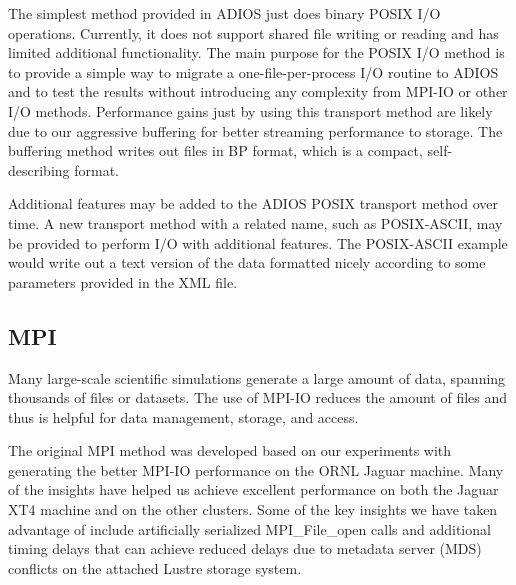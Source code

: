 The simplest method provided in ADIOS just does binary POSIX I/O operations. Currently, 
it does not support shared file writing or reading and has limited additional functionality. 
The main purpose for the POSIX I/O method is to provide a simple way to migrate 
a one-file-per-process I/O routine to ADIOS and to test the results without introducing 
any complexity from MPI-IO or other I/O methods. Performance gains just by using 
this transport method are likely due to our aggressive buffering for better streaming 
performance to storage. The buffering method writes out files in BP format, which 
is a compact, self-describing format. 

Additional features may be added to the ADIOS POSIX transport method over time. 
A new transport method with a related name, such as POSIX-ASCII, may be provided 
to perform I/O with additional features. The POSIX-ASCII example would write out 
a text version of the data formatted nicely according to some parameters provided 
in the XML file.

\subsection{MPI}

Many large-scale scientific simulations generate a large amount of data, spanning 
thousands of files or datasets. The use of MPI-IO reduces the amount of files and 
thus is helpful for data management, storage, and access. 

The original MPI method was developed based on our experiments with generating 
the better MPI-IO performance on the ORNL Jaguar machine. Many of the insights 
have helped us achieve excellent performance on both the Jaguar XT4 machine and 
on the other clusters. Some of the key insights we have taken advantage of include 
artificially serialized MPI\_File\_open calls and additional timing delays that 
can achieve reduced delays due to metadata server (MDS) conflicts on the attached 
Lustre storage system.

